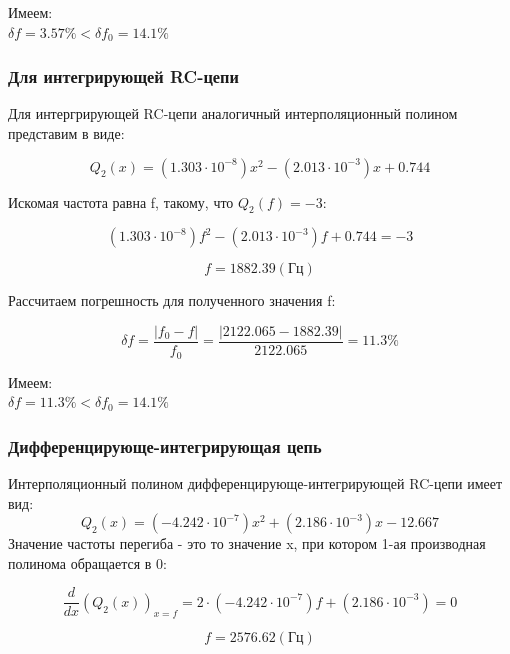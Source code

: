 Имеем:\\
$\delta f = 3.57 \% < \delta f_0 = 14.1\%$

\subsubsection{Для интегрирующей RC-цепи}
Для интергрирующей RC-цепи аналогичный интерполяционный полином представим в виде:

\begin{equation}
Q_2(x) = (1.303 \cdot 10^{-8})x^2 - (2.013 \cdot 10^{-3})x + 0.744
\end{equation}

Искомая частота равна f, такому, что $Q_2(f) = -3$:

\begin{equation}
(1.303 \cdot 10^{-8})f^2 - (2.013 \cdot 10^{-3})f + 0.744 = -3
\end{equation}

\begin{equation}
f = 1882.39 (\text{Гц})
\end{equation}

Рассчитаем погрешность для полученного значения f:

\begin{equation}
\delta f = \frac{|f_0 - f|}{f_0} = \frac{|2122.065 - 1882.39|}{2122.065} = 11.3 \% 
\end{equation}

Имеем:\\
$\delta f = 11.3 \% < \delta f_0 = 14.1\%$

\subsubsection{Дифференцирующе-интегрирующая цепь}
Интерполяционный полином дифференцирующе-интегрирующей RC-цепи имеет вид:
\begin{equation}
Q_2(x) = (-4.242 \cdot 10^{-7})x^2 + (2.186 \cdot 10^{-3})x -12.667
\end{equation}
Значение частоты перегиба - это то значение x, при котором 1-ая производная полинома обращается в 0:

\begin{equation}
\frac{d}{dx} (Q_2(x))_{x=f} = 2 \cdot (-4.242 \cdot 10^{-7})f + (2.186 \cdot 10^{-3}) = 0
\end{equation}

\begin{equation}
f = 2576.62 (\text{Гц})
\end{equation}

